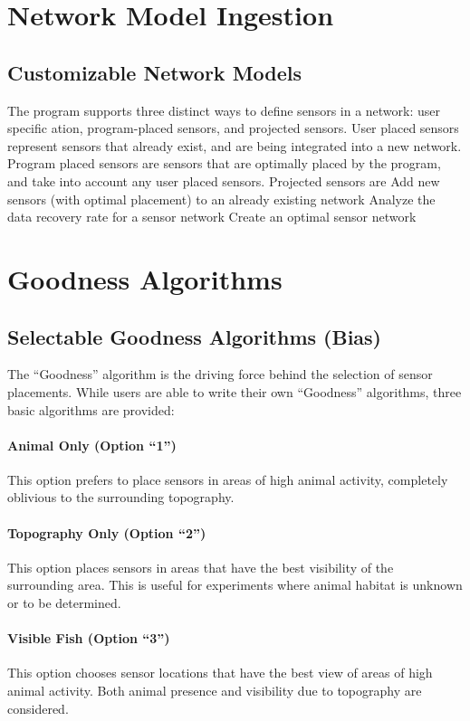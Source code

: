 \section{Network Model Ingestion}
\subsection{Customizable Network Models}
The program supports three distinct ways to define sensors in a network: 
user specific ation, program-placed sensors, and projected sensors. 
User placed sensors represent sensors that already exist, and are being integrated into a new network.
Program placed sensors are sensors that are optimally placed by the program, and take into account any user placed sensors.
Projected sensors are 
Add new sensors (with optimal placement) to an already existing network
Analyze the data recovery rate for a sensor network
Create an optimal sensor network

\section{Goodness Algorithms}
\subsection{Selectable Goodness Algorithms (Bias)}
The “Goodness” algorithm is the driving force behind the selection of sensor placements.  While users are able to write their own “Goodness” algorithms, three basic algorithms are provided: 

\paragraph{Animal Only (Option “1”)}
This option prefers to place sensors in areas of high animal activity, completely oblivious to the surrounding topography.  

\paragraph{Topography Only (Option “2”)}
This option places sensors in areas that have the best visibility of the surrounding area.  This is useful for experiments where animal habitat is unknown or to be determined.

\paragraph{Visible Fish (Option “3”)}
This option chooses sensor locations that have the best view of areas of high animal activity.  Both animal presence and visibility due to topography are considered.
